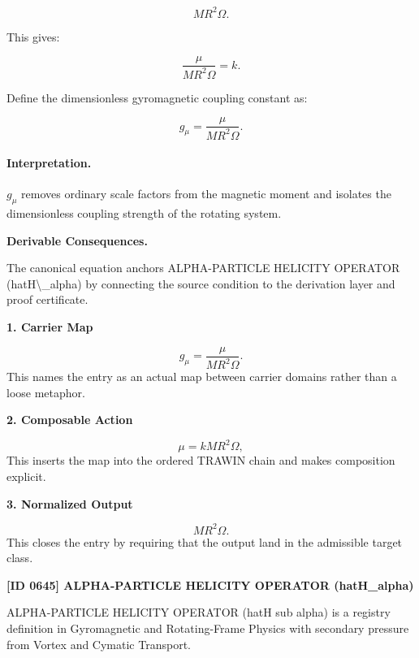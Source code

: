 \begin{equation}
MR^2\Omega .
\end{equation}

This gives:

\begin{equation}
\frac{\mu}{MR^2\Omega}=k .
\end{equation}

Define the dimensionless gyromagnetic coupling constant as:

\begin{equation}
\boxed{
g_{\mu}
=
\frac{\mu}
{MR^2\Omega}.
}
\end{equation}

\paragraph{Interpretation.}
$g_{\mu}$ removes ordinary scale factors from the magnetic moment and isolates the dimensionless coupling strength of the rotating system.

\par\vspace{0.35em}
\noindent\textbf{Derivable Consequences.}\quad
\begingroup
\footnotesize
\raggedright
The canonical equation anchors ALPHA-PARTICLE HELICITY OPERATOR (hatH\textbackslash{}\_alpha) by connecting the source condition to the derivation layer and proof certificate.
\par\endgroup

\noindent\textbf{1. Carrier Map}\par
\[
g_{\mu} = \frac{\mu} {MR^2\Omega}.
\]
\noindent This names the entry as an actual map between carrier domains rather than a loose metaphor.\par
\noindent\textbf{2. Composable Action}\par
\[
\mu = kMR^2\Omega ,
\]
\noindent This inserts the map into the ordered TRAWIN chain and makes composition explicit.\par
\noindent\textbf{3. Normalized Output}\par
\[
MR^2\Omega.
\]
\noindent This closes the entry by requiring that the output land in the admissible target class.\par

\clearpage
\noindent\textbf{[ID 0645] ALPHA-PARTICLE HELICITY OPERATOR (hatH\_alpha)}\par
\vspace{0.35em}
\begingroup\small
{}
ALPHA-PARTICLE HELICITY OPERATOR (hatH sub alpha) is a registry definition in Gyromagnetic and Rotating-Frame Physics with secondary pressure from Vortex and Cymatic Transport.

